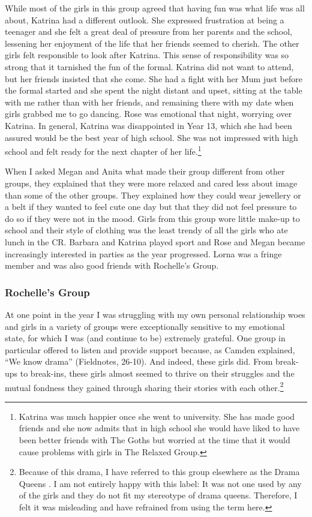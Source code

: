 While most of the girls in this group agreed that having fun was what life was all about, Katrina had a different outlook. She expressed frustration at being a teenager and she felt a great deal of pressure from her parents and the school, lessening her enjoyment of the life that her friends seemed to cherish. The other girls felt responsible to look after Katrina. This sense of responsibility was so strong that it tarnished the fun of the formal. Katrina did not want to attend, but her friends insisted that she come. She had a fight with her Mum just before the formal started and she spent the night distant and upset, sitting at the table with me rather than with her friends, and remaining there with my date when girls grabbed me to go dancing. Rose was emotional that night, worrying over Katrina. In general, Katrina was disappointed in Year 13, which she had been assured would be the best year of high school. She was not impressed with high school and felt ready for the next chapter of her life.\footnote{Katrina was much happier once she went to university. She has made good friends and she now admits that in high school she would have liked to have been better friends with The Goths but worried at the time that it would cause problems with girls in The Relaxed Group.}  


When I asked Megan and Anita what made their group different from other groups, they explained that they were more relaxed and cared less about image than some of the other groups. They explained how they could wear jewellery or a belt if they wanted to feel cute one day but that they did not feel pressure to do so if they were not in the mood. Girls from this group wore little make-up to school and their style of clothing was the least trendy of all the girls who ate lunch in the CR. Barbara and Katrina played sport and Rose and Megan became increasingly interested in parties as the year progressed. Lorna was a fringe member and was also good friends with Rochelle's Group.

\subsubsection{Rochelle's Group}
At one point in the year I was struggling with my own personal relationship woes and girls in a variety of groups were exceptionally sensitive to my emotional state, for which I was (and continue to be) extremely grateful. One group in particular offered to listen and provide support because, as Camden explained, ``We know drama'' (Fieldnotes, 26-10). And indeed, these girls did. From break-ups to break-ins, these girls almost seemed to thrive on their struggles and the mutual fondness they gained through sharing their stories with each other.\footnote{Because of this drama, I have referred to this group elsewhere as the Drama Queens \citep{drager2008lsa}. I am not entirely happy with this label: It was not one used by any of the girls and they do not fit my stereotype of drama queens. Therefore, I felt it was misleading and have refrained from using the term here.}

